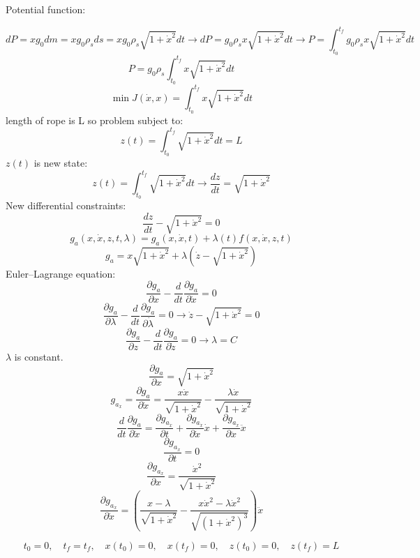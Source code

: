Potential function:


$$dP = xg_0dm = xg_0\rho_s ds = xg_0\rho_s\sqrt{1+\dot{x}^2}dt
\to dP = g_0\rho_sx\sqrt{1+\dot{x}^2} dt\to P = \int_{t_0}^{t_f} g_0\rho_sx\sqrt{1+\dot{x}^2}dt
$$
$$P = g_0\rho_s\int_{t_0}^{t_f} x\sqrt{1+\dot{x}^2}dt$$
$$\min J(\dot{x}, x) = \int_{t_0}^{t_f} x\sqrt{1+\dot{x}^2}dt$$
length of rope is L so problem subject to:
$$z(t) = \int_{t_0}^{t_f} \sqrt{1+\dot{x}^2}dt = L$$ 
$z(t)$ is new state:
$$z(t) = \int_{t_0}^{t_f} \sqrt{1+\dot{x}^2}dt\to \dfrac{dz}{dt} =\sqrt{1+\dot{x}^2} $$
New differential constraints:
$$\dfrac{dz}{dt} - \sqrt{1+\dot{x}^2}  = 0$$
$$g_a(x, \dot x, z, t, \lambda) = g_a(x, \dot x, t) + \lambda(t)f(x, \dot x, z, t) $$
$$g_a = x\sqrt{1+\dot{x}^2} + \lambda (\dot z - \sqrt{1+\dot{x}^2})$$
Euler–Lagrange equation:
$$\dfrac{\partial g_a}{\partial x} - \dfrac{d}{dt}\dfrac{\partial g_a}{\partial \dot x} = 0$$
$$\dfrac{\partial g_a}{\partial \lambda} - \dfrac{d}{dt}\dfrac{\partial g_a}{\partial \dot \lambda} = 0 \to 
\dot z -  \sqrt{1+\dot{x}^2} = 0
$$
$$\dfrac{\partial g_a}{\partial z} - \dfrac{d}{dt}\dfrac{\partial g_a}{\partial \dot z} = 0 \to \lambda = C$$
$\lambda$ is constant.
$$\dfrac{\partial g_a}{\partial x} =  \sqrt{1+\dot{x}^2}$$
$$g_{a_{\dot{x}}} = \dfrac{\partial g_a}{\partial \dot x} = \dfrac{x\dot x}{\sqrt{1+\dot x^2}}  - \dfrac{\lambda \dot x}{\sqrt{1+\dot x^2}} $$
$$\dfrac{d}{dt}\dfrac{\partial g_a}{\partial \dot x} = \dfrac{\partial g_{a_{\dot{x}}}}{\partial  t}+
\dfrac{\partial g_{a_{\dot{x}}}}{\partial \dot x}\dot x+
\dfrac{\partial g_{a_{\dot{x}}}}{\partial \ddot x} \ddot x
$$
$$\dfrac{\partial g_{a_{\dot{x}}}}{\partial t} = 0$$
$$\dfrac{\partial g_{a_{\dot{x}}}}{\partial x} =  \dfrac{ \dot x^2}{\sqrt{1+\dot x^2}}$$
$$\dfrac{\partial g_{a_{\dot{x}}}}{\partial \dot x} = (\dfrac{x - \lambda }{\sqrt{1+\dot x^2}}
- \dfrac{x\dot x^2 - \lambda \dot x^2}{\sqrt{(1+\dot x^2)^3}})\ddot x
$$


$$t_0 = 0,\quad t_f =t_f,\quad x(t_0) = 0,\quad x(t_f) = 0,\quad z(t_0) = 0,\quad z(t_f) = L$$


